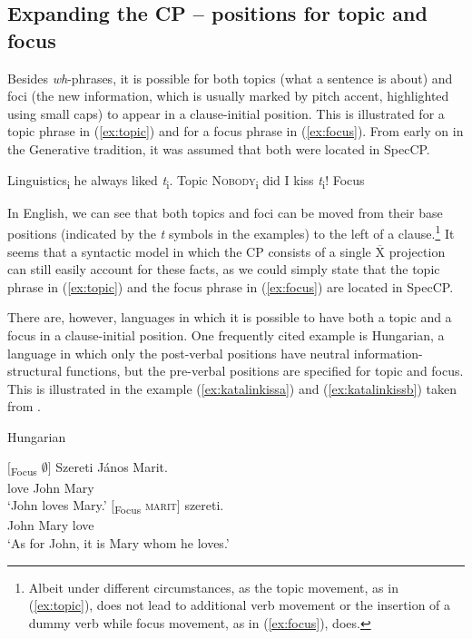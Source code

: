 \subsection{Expanding the CP -- positions for topic and focus}\label{expanding}
Besides \textit{wh}-phrases, it is possible for both topics (what a sentence is about) and foci (the new information, which is usually marked by pitch accent, highlighted using small caps) to appear in a clause-initial position. This is illustrated for a topic phrase in (\ref{ex:topic}) and for a focus phrase in (\ref{ex:focus}). From early on in the Generative tradition, it was assumed that both were located in SpecCP.

\begin{exe}
\ex\begin{xlist} 
\ex Linguistics\textsubscript{i} he always liked \textit{t}\textsubscript{i}. \hfill Topic \label{ex:topic}
\ex \textsc{Nobody}\textsubscript{i} did I kiss \textit{t}\textsubscript{i}! \hfill Focus \label{ex:focus}
\end{xlist}
\end{exe}

\noindent In English, we can see that both topics and foci can be moved from their base positions (indicated by the \textit{t} symbols in the examples) to the left of a clause.\footnote{ Albeit under different circumstances, as the topic movement, as in (\ref{ex:topic}), does not lead to additional verb movement or the insertion of a dummy verb while focus movement, as in (\ref{ex:focus}), does.} It seems that a syntactic model in which the CP consists of a single $\overline{\textrm{X}}$ projection can still easily account for these facts, as we could simply state that the topic phrase in (\ref{ex:topic}) and the focus phrase in (\ref{ex:focus}) are located in SpecCP. 

There are, however, languages in which it is possible to have both a topic and a focus in a clause-initial position. One frequently cited example is Hungarian, a language in which only the post-verbal positions have neutral information-structural functions, but the pre-verbal positions are specified for topic and focus. This is illustrated in the example (\ref{ex:katalinkissa}) and (\ref{ex:katalinkissb}) taken from \citet{kiss1981structural}.


\begin{exe}
\ex Hungarian \citep{kiss1981structural} \begin{xlist} 
\ex {} {$[$\textsubscript{Focus} $\emptyset ]$} {Szereti} {János} {Marit.} \\
{} {} {love} {John} {Mary} \\
\trans `John loves Mary.' \label{ex:katalinkissa}
\ex {} {$[$\textsubscript{Focus} \textsc{marit}$]$} {szereti.}  \\
{\hspace*{\fill} John} {Mary} {love}  \\
\trans `As for John, it is Mary whom he loves.' \label{ex:katalinkissb}
\end{xlist}
\end{exe}


